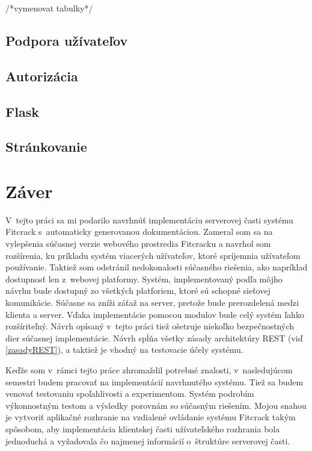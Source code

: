 \documentclass[slovak,cprint]{fitthesis} %
\begin{document}
/*vymenovat tabulky*/


\section{Podpora užívateľov}

\section{Autorizácia}

\section{Flask}

\section{Stránkovanie}


\chapter{Záver}\label{zaver}
V~tejto práci sa mi podarilo navrhnúť implementáciu serverovej časti systému Fitcrack s~automaticky generovanou dokumentáciou. Zameral som sa na vylepšenia súčasnej verzie webového prostredia Fitcracku a navrhol som rozšírenia, ku príkladu systém viacerých užívateľov, ktoré spríjemnia užívateľom používanie. Taktiež som odstránil nedokonalosti súčasného riešenia, ako napríklad dostupnosť len z~webovej platformy. Systém, implementovaný podľa môjho návrhu bude dostupný zo všetkých platforiem, ktoré sú schopné sieťovej komunikácie. Súčasne sa zníži záťaž na server, pretože bude prerozdelená medzi klienta a server. Vďaka implementácie pomocou modulov bude celý systém ľahko rozšíriteľný. Návrh opísaný v~tejto práci tiež ošetruje niekoľko bezpečnostných dier súčasnej implementácie. Návrh spĺňa všetky zásady architektúry REST (viď \ref{zasadyREST}), a taktiež je vhodný na testovacie účely systému.

Keďže som v~rámci tejto práce zhromaždil potrebné znalosti, v~nasledujúcom semestri budem pracovať na implementácií navrhnutého systému. Tiež sa budem venovať testovaniu spoľahlivosti a experimentom. Systém podrobím výkonnostným testom a výsledky porovnám so súčasným riešením. 
Mojou snahou je vytvoriť aplikačné rozhranie na vzdialené ovládanie systému Fitcrack takým spôsobom, aby implementácia klientskej časti užívateľského rozhrania bola jednoduchá a vyžadovala čo najmenej informácií o~štruktúre serverovej časti. 
\end{document}

